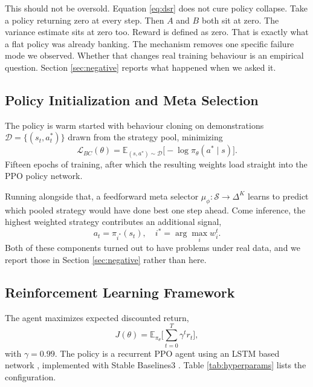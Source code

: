 \documentclass[conference]{IEEEtran}
\begin{document}
This should not be oversold. Equation \ref{eq:dsr} does not cure policy collapse. Take a policy returning zero at every step. Then $A$ and $B$ both sit at zero. The variance estimate sits at zero too. Reward is defined as zero. That is exactly what a flat policy was already banking. The mechanism removes one specific failure mode we observed. Whether that changes real training behaviour is an empirical question. Section \ref{sec:negative} reports what happened when we asked it.

\subsection{Policy Initialization and Meta Selection}

The policy is warm started with behaviour cloning on demonstrations $\mathcal{D} = \{(s_t, a^*_t)\}$ drawn from the strategy pool, minimizing
\begin{equation}
\mathcal{L}_{BC}(\theta) = \mathbb{E}_{(s,a^*)\sim\mathcal{D}}\big[-\log \pi_\theta(a^*\mid s)\big].
\label{eq:bcloss}
\end{equation}
Fifteen epochs of training, after which the resulting weights load straight into the PPO policy network.

Running alongside that, a feedforward meta selector $\mu_\phi : \mathcal{S} \rightarrow \Delta^K$ learns to predict which pooled strategy would have done best one step ahead. Come inference, the highest weighted strategy contributes an additional signal,
\begin{equation}
a_t = \pi_{i^*}(s_t), \quad i^* = \arg\max_i w_i^t.
\label{eq:metaselect}
\end{equation}
Both of these components turned out to have problems under real data, and we report those in Section \ref{sec:negative} rather than here.

\subsection{Reinforcement Learning Framework}

The agent maximizes expected discounted return,
\begin{equation}
J(\theta) = \mathbb{E}_{\pi_\theta}\Big[\sum_{t=0}^{T} \gamma^t r_t\Big],
\label{eq:objective}
\end{equation}
with $\gamma = 0.99$. The policy is a recurrent PPO agent \cite{schulman2017ppo} using an LSTM based network \cite{hochreiter1997lstm}, implemented with Stable Baselines3 \cite{raffin2021stablebaselines3}. Table \ref{tab:hyperparams} lists the configuration.
\end{document}
